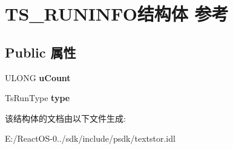 \hypertarget{struct_t_s___r_u_n_i_n_f_o}{}\section{T\+S\+\_\+\+R\+U\+N\+I\+N\+F\+O结构体 参考}
\label{struct_t_s___r_u_n_i_n_f_o}
\subsection*{Public 属性}
\begin{DoxyCompactItemize}
\item 
\mbox{\label{struct_t_s___r_u_n_i_n_f_o_a30d52a81e6f0883f05b219544c2c3ef8}} 
U\+L\+O\+NG {\bfseries u\+Count}
\item 
\mbox{\label{struct_t_s___r_u_n_i_n_f_o_a9ef2e6b68090141539ef04092b91b814}} 
Ts\+Run\+Type {\bfseries type}
\end{DoxyCompactItemize}


该结构体的文档由以下文件生成\+:\begin{DoxyCompactItemize}
\item 
E\+:/\+React\+O\+S-\/0../sdk/include/psdk/textstor.\+idl\end{DoxyCompactItemize}
